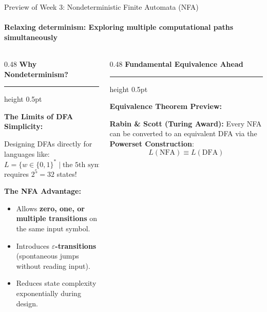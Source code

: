 \documentclass[aspectratio=169, 10pt]{beamer}
\newcommand{\colheader}[1]{%
  {\noindent\footnotesize\bfseries\color{gimpanavy}#1}%
  \vspace{0.02cm}%
  {\color{gimpanavy!30}\hrule height 0.5pt}%
  \vspace{0.05cm}%
}
\newcommand{\cardtitle}[1]{{\noindent\footnotesize\bfseries\color{gimpanavy}#1}\par\vspace{0.03cm}}
\begin{document}
\begin{frame}{Preview of Week 3: Nondeterministic Finite Automata (NFA)}
  \framesubtitle{Relaxing determinism: Exploring multiple computational paths simultaneously}
  
  \begin{columns}[T]
    \begin{column}{0.48\textwidth}
      \colheader{Why Nondeterminism?}
      \begin{tcolorbox}[conceptcard]
        \cardtitle{The Limits of DFA Simplicity:}
        {\scriptsize
        Designing DFAs directly for languages like:
        \[ L = \{w \in \{0, 1\}^* \mid \text{the 5th symbol from the end is } 1\} \]
        requires $2^5 = 32$ states!
        \vspace{0.04cm}
        
        \textbf{The NFA Advantage:}
        \begin{itemize}\setlength{\itemsep}{1.5pt}\scriptsize
          \item Allows \textbf{zero, one, or multiple transitions} on the same input symbol.
          \item Introduces \textbf{$\varepsilon$-transitions} (spontaneous jumps without reading input).
          \item Reduces state complexity exponentially during design.
        \end{itemize}
        }
      \end{tcolorbox}
    \end{column}
    
    \begin{column}{0.48\textwidth}
      \colheader{Fundamental Equivalence Ahead}
      \begin{center}
      \end{center}
      \begin{tcolorbox}[spotlightcard]
        \cardtitle{Equivalence Theorem Preview:}
        {\scriptsize
        \textbf{Rabin \& Scott (Turing Award):} Every NFA can be converted to an equivalent DFA via the \textbf{Powerset Construction}:
        \[ L(\text{NFA}) \equiv L(\text{DFA}) \]
        }
      \end{tcolorbox}
    \end{column}
  \end{columns}
\end{frame}
\end{document}
